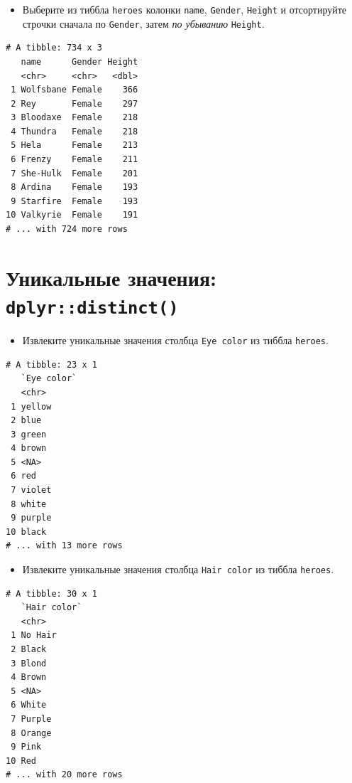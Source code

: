 \documentclass[
]{book}
\providecommand{\tightlist}{%
  \setlength{\itemsep}{0pt}\setlength{\parskip}{0pt}}
\begin{document}
\begin{itemize}
\tightlist
\item
  Выберите из тиббла \texttt{heroes} колонки \texttt{name}, \texttt{Gender}, \texttt{Height} и отсортируйте строчки сначала по \texttt{Gender}, затем \emph{по убыванию} \texttt{Height}.
\end{itemize}

\begin{verbatim}
# A tibble: 734 x 3
   name      Gender Height
   <chr>     <chr>   <dbl>
 1 Wolfsbane Female    366
 2 Rey       Female    297
 3 Bloodaxe  Female    218
 4 Thundra   Female    218
 5 Hela      Female    213
 6 Frenzy    Female    211
 7 She-Hulk  Female    201
 8 Ardina    Female    193
 9 Starfire  Female    193
10 Valkyrie  Female    191
# ... with 724 more rows
\end{verbatim}

\hypertarget{task_dist}{%
\section{\texorpdfstring{Уникальные значения: \texttt{dplyr::distinct()}}{Уникальные значения: dplyr::distinct()}}\label{task_dist}}

\begin{itemize}
\tightlist
\item
  Извлеките уникальные значения столбца \texttt{Eye\ color} из тиббла \texttt{heroes}.
\end{itemize}

\begin{verbatim}
# A tibble: 23 x 1
   `Eye color`
   <chr>      
 1 yellow     
 2 blue       
 3 green      
 4 brown      
 5 <NA>       
 6 red        
 7 violet     
 8 white      
 9 purple     
10 black      
# ... with 13 more rows
\end{verbatim}

\begin{itemize}
\tightlist
\item
  Извлеките уникальные значения столбца \texttt{Hair\ color} из тиббла \texttt{heroes}.
\end{itemize}

\begin{verbatim}
# A tibble: 30 x 1
   `Hair color`
   <chr>       
 1 No Hair     
 2 Black       
 3 Blond       
 4 Brown       
 5 <NA>        
 6 White       
 7 Purple      
 8 Orange      
 9 Pink        
10 Red         
# ... with 20 more rows
\end{verbatim}
\end{document}
